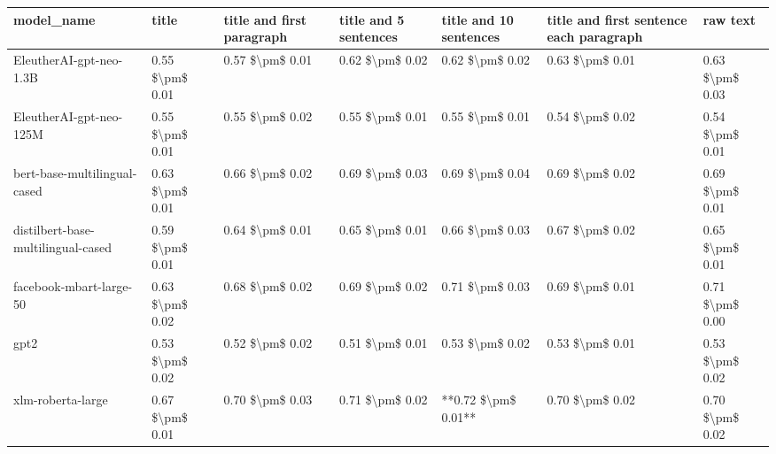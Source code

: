 \begin{tabular}{lllllll}
\toprule
                        model\_name &           title & title and first paragraph & title and 5 sentences & title and 10 sentences & title and first sentence each paragraph &        raw text \\
\midrule
           EleutherAI-gpt-neo-1.3B & 0.55 \$\textbackslash pm\$ 0.01 &           0.57 \$\textbackslash pm\$ 0.01 &       0.62 \$\textbackslash pm\$ 0.02 &        0.62 \$\textbackslash pm\$ 0.02 &                         0.63 \$\textbackslash pm\$ 0.01 & 0.63 \$\textbackslash pm\$ 0.03 \\
           EleutherAI-gpt-neo-125M & 0.55 \$\textbackslash pm\$ 0.01 &           0.55 \$\textbackslash pm\$ 0.02 &       0.55 \$\textbackslash pm\$ 0.01 &        0.55 \$\textbackslash pm\$ 0.01 &                         0.54 \$\textbackslash pm\$ 0.02 & 0.54 \$\textbackslash pm\$ 0.01 \\
      bert-base-multilingual-cased & 0.63 \$\textbackslash pm\$ 0.01 &           0.66 \$\textbackslash pm\$ 0.02 &       0.69 \$\textbackslash pm\$ 0.03 &        0.69 \$\textbackslash pm\$ 0.04 &                         0.69 \$\textbackslash pm\$ 0.02 & 0.69 \$\textbackslash pm\$ 0.01 \\
distilbert-base-multilingual-cased & 0.59 \$\textbackslash pm\$ 0.01 &           0.64 \$\textbackslash pm\$ 0.01 &       0.65 \$\textbackslash pm\$ 0.01 &        0.66 \$\textbackslash pm\$ 0.03 &                         0.67 \$\textbackslash pm\$ 0.02 & 0.65 \$\textbackslash pm\$ 0.01 \\
           facebook-mbart-large-50 & 0.63 \$\textbackslash pm\$ 0.02 &           0.68 \$\textbackslash pm\$ 0.02 &       0.69 \$\textbackslash pm\$ 0.02 &        0.71 \$\textbackslash pm\$ 0.03 &                         0.69 \$\textbackslash pm\$ 0.01 & 0.71 \$\textbackslash pm\$ 0.00 \\
                              gpt2 & 0.53 \$\textbackslash pm\$ 0.02 &           0.52 \$\textbackslash pm\$ 0.02 &       0.51 \$\textbackslash pm\$ 0.01 &        0.53 \$\textbackslash pm\$ 0.02 &                         0.53 \$\textbackslash pm\$ 0.01 & 0.53 \$\textbackslash pm\$ 0.02 \\
                 xlm-roberta-large & 0.67 \$\textbackslash pm\$ 0.01 &           0.70 \$\textbackslash pm\$ 0.03 &       0.71 \$\textbackslash pm\$ 0.02 &    **0.72 \$\textbackslash pm\$ 0.01** &                         0.70 \$\textbackslash pm\$ 0.02 & 0.70 \$\textbackslash pm\$ 0.02 \\
\bottomrule
\end{tabular}
